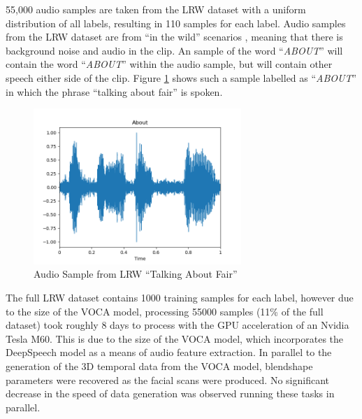 55,000 audio samples are taken from the LRW dataset with a uniform distribution of all labels, resulting in 110 samples for each label.
Audio samples from the LRW dataset are from ``in the wild'' scenarios \cite{Chung2016}, meaning that there is background noise and audio in the clip.
An sample of the word ``\textit{ABOUT}'' will contain the word ``\textit{ABOUT}'' within the audio sample, but will contain other speech either side of the clip.
Figure \ref{fig:LRW_About} shows such a sample labelled as ``\textit{ABOUT}'' in which the phrase ``talking about fair'' is spoken.

\begin{figure}[h]
    \centering
        \includegraphics[width=0.7\textwidth]{figures/dataset/about.png}
    \caption{Audio Sample from LRW \cite{Chung2016} ``Talking About Fair''}\label{fig:LRW_About}
\end{figure}

The full LRW dataset contains 1000 training samples for each label, however due to the size of the VOCA model, processing 55000 samples (11\% of the full dataset) took roughly 8 days to process with the GPU acceleration of an Nvidia Tesla M60.
This is due to the size of the VOCA model, which incorporates the DeepSpeech model as a means of audio feature extraction.
In parallel to the generation of the 3D temporal data from the VOCA model, blendshape parameters were recovered as the facial scans were produced.
No significant decrease in the speed of data generation was observed running these tasks in parallel.

